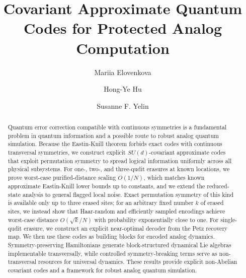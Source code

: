 \documentclass[10pt,twocolumn,superscriptaddress,aps,amsmath,amssymb,citeautoscript,floatfix,prx]{revtex4-2}
\title@column\titleblock@produce
\makeatletter
\def\maketitle{
\@author@finish
\title@column\titleblock@produce
\suppressfloats[t]}
\newcounter{alg}
\theoremstyle{plain}
\theoremstyle{plain}
\theoremstyle{plain}
\theoremstyle{plain}
\theoremstyle{plain}
\theoremstyle{plain}
\theoremstyle{plain}
\theoremstyle{definition}
\theoremstyle{plain}
\makeatother
\begin{document}
 
\title{
Covariant Approximate Quantum Codes for Protected Analog Computation
}
 
\author{Mariia Elovenkova}

\author{Hong-Ye Hu}

\author{Susanne F. Yelin}
 
\begin{abstract}

Quantum error correction compatible with continuous symmetries is a fundamental problem in quantum information and a possible route to robust analog quantum simulation. 
Because the Eastin-Knill theorem forbids exact codes with continuous transversal symmetries, we construct explicit \(SU(d)\)-covariant approximate codes that exploit permutation symmetry to 
spread logical information uniformly across all physical subsystems. For one-, two-, and three-qudit erasures at known locations, we prove worst-case purified-distance scaling \(O(1/N)\), 
which matches known approximate Eastin-Knill lower bounds up to constants, and we extend the reduced-state analysis to general flagged local noise. Exact permutation symmetry of this kind is available only up to three erased sites; 
for an arbitrary fixed number $k$ of erased sites, we instead show that Haar-random and efficiently sampled encodings achieve worst-case distance $O(\sqrt{k}/N)$ with probability exponentially close to one. 
For single-qudit erasure, we construct an explicit near-optimal decoder from the Petz recovery map. We then use these codes as building blocks for encoded analog dynamics. 
Symmetry-preserving Hamiltonians generate block-structured dynamical Lie algebras implementable transversally, while controlled symmetry-breaking terms serve as non-transversal resources for universal dynamics. 
These results provide explicit non-Abelian covariant codes and a framework for robust analog quantum simulation.

\end{abstract}
\maketitle 
{}
\end{document}
